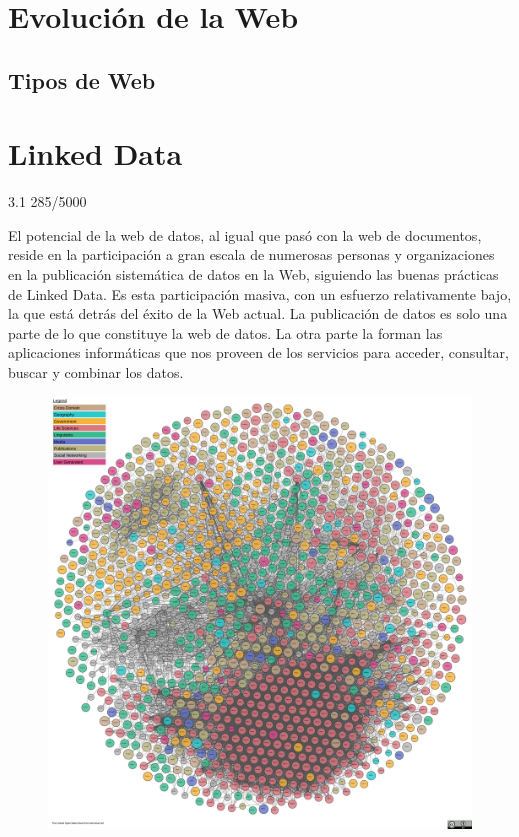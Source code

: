 \section*{Evolución de la Web}
\label{ch:ApendiceA}

\subsection{Tipos de Web} %

\section{Linked Data}
3.1 
285/5000

El potencial de la web de datos, al igual que pasó con la web de documentos, reside en la participación a gran escala de numerosas personas y organizaciones en la publicación sistemática de datos en la Web, siguiendo las buenas prácticas de Linked Data. Es esta participación masiva, con un esfuerzo relativamente bajo, la que está detrás del éxito de la Web actual. La publicación de datos es solo una parte de lo que constituye la web de datos. La otra parte la forman las aplicaciones informáticas que nos proveen de los servicios para acceder, consultar, buscar y combinar los datos. 


\begin{figure}
	\centering
	\includegraphics[width=0.7\linewidth]{imagenes/capitulo3/lod-cloud-sm}
	\caption{}
	\label{fig:lod-cloud-sm}
\end{figure}

